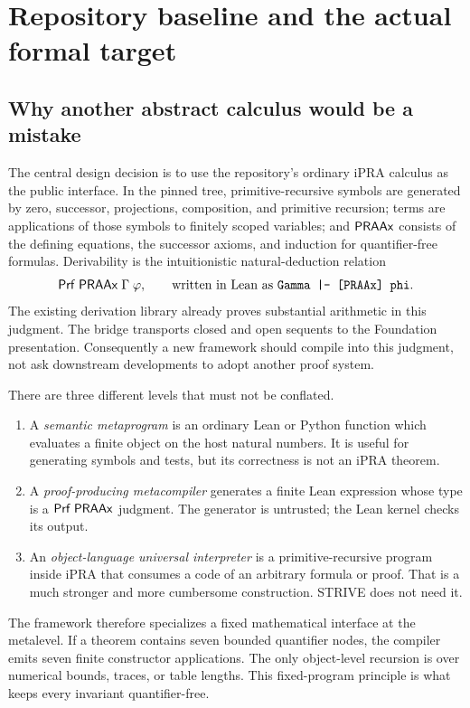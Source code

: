 \section{Repository baseline and the actual formal target}

\subsection{Why another abstract calculus would be a mistake}

The central design decision is to use the repository's ordinary iPRA calculus
as the public interface.  In the pinned tree, primitive-recursive symbols are
generated by zero, successor, projections, composition, and primitive
recursion; terms are applications of those symbols to finitely scoped
variables; and \(\mathsf{PRAAx}\) consists of the defining equations, the successor
axioms, and induction for quantifier-free formulas.  Derivability is the
intuitionistic natural-deduction relation
\[
  \mathsf{Prf}\;\mathsf{PRAAx}\;\Gamma\;\varphi,
  \qquad\text{written in Lean as }\texttt{Gamma |- [PRAAx] phi}.
\]
The existing derivation library already proves substantial arithmetic in this
judgment.  The bridge transports closed and open sequents to the Foundation
presentation.  Consequently a new framework should compile into this judgment,
not ask downstream developments to adopt another proof system.

There are three different levels that must not be conflated.

\begin{enumerate}
\item A \emph{semantic metaprogram} is an ordinary Lean or Python function
which evaluates a finite object on the host natural numbers.  It is useful for
generating symbols and tests, but its correctness is not an iPRA theorem.
\item A \emph{proof-producing metacompiler} generates a finite Lean expression
whose type is a \(\mathsf{Prf}\;\mathsf{PRAAx}\) judgment.  The generator is untrusted; the
Lean kernel checks its output.
\item An \emph{object-language universal interpreter} is a primitive-recursive
program inside iPRA that consumes a code of an arbitrary formula or proof.
That is a much stronger and more cumbersome construction.  STRIVE does not
need it.
\end{enumerate}

The framework therefore specializes a fixed mathematical interface at the
metalevel.  If a theorem contains seven bounded quantifier nodes, the compiler
emits seven finite constructor applications.  The only object-level recursion
is over numerical bounds, traces, or table lengths.  This fixed-program
principle is what keeps every invariant quantifier-free.

